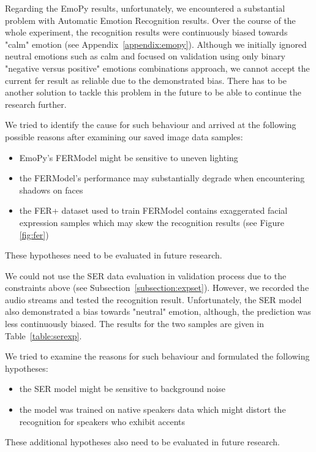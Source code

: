 Regarding the EmoPy results, unfortunately, we encountered a substantial problem with Automatic Emotion Recognition results. Over the course of the whole experiment, the recognition results were continuously biased towards "calm" emotion (see Appendix~\ref{appendix:emopy}). Although we initially ignored neutral emotions such as calm and focused on validation using only binary "negative versus positive" emotions combinations approach, we cannot accept the current \acrlong{fer} result as reliable due to the demonstrated bias. There has to be another solution to tackle this problem in the future to be able to continue the research further.

We tried to identify the cause for such behaviour and arrived at the following possible reasons after examining our saved image data samples:
\begin{itemize}
    \item EmoPy's FERModel might be sensitive to uneven lighting
    \item the FERModel's performance may substantially degrade when encountering shadows on faces  
    \item the FER+ dataset used to train FERModel contains exaggerated facial expression samples which may skew the recognition results (see Figure \ref{fig:fer})
\end{itemize}
These hypotheses need to be evaluated in future research.

We could not use the SER data evaluation in validation process due to the constraints above (see Subsection~\ref{subsection:expset}). However, we recorded the audio streams and tested the recognition result. Unfortunately, the SER model also demonstrated a bias towards "neutral" emotion, although, the prediction was less continuously biased. The results for the two samples are given in Table~\ref{table:serexp}.

We tried to examine the reasons for such behaviour and formulated the following hypotheses:
\begin{itemize}
    \item the SER model might be sensitive to background noise
    \item the model was trained on native speakers data which might distort the recognition for speakers who exhibit accents
\end{itemize}
These additional hypotheses also need to be evaluated in future research.

